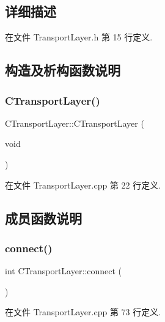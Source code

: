 \subsection{详细描述}


在文件 Transport\+Layer.\+h 第 15 行定义.



\subsection{构造及析构函数说明}
\mbox{\label{class_c_transport_layer_ac28ec2550ebfcb876e31264f65d1e8d6}} 
\subsubsection{\texorpdfstring{C\+Transport\+Layer()}{CTransportLayer()}}
{\footnotesize\ttfamily C\+Transport\+Layer\+::\+C\+Transport\+Layer (\begin{DoxyParamCaption}\item[{void}]{ }\end{DoxyParamCaption})}



在文件 Transport\+Layer.\+cpp 第 22 行定义.



\subsection{成员函数说明}
\mbox{\label{class_c_transport_layer_a5830c0965a4a9501ffb33ae8d2acb58b}} 
\subsubsection{\texorpdfstring{connect()}{connect()}}
{\footnotesize\ttfamily int C\+Transport\+Layer\+::connect (\begin{DoxyParamCaption}{ }\end{DoxyParamCaption})}



在文件 Transport\+Layer.\+cpp 第 73 行定义.

